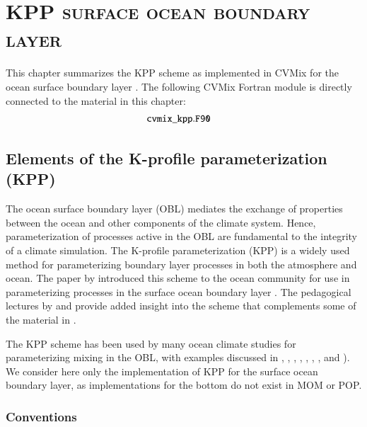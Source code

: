 \chapter{\scshape KPP surface ocean boundary layer}
\label{chapter:cvmix_kpp}

\minitoc
\vspace{.5cm}

\begin{mdframed}[backgroundcolor=lightgray!50]
  This chapter summarizes the KPP scheme as implemented in CVMix for
  the ocean surface boundary layer \citep{LargeKPP}.  The following
  CVMix Fortran module is directly connected to the material in this
  chapter:
\begin{align*} 
 & {\tt cvmix\_kpp.F90}
\end{align*}
\end{mdframed}


\section{Elements of the K-profile parameterization (KPP)}
\label{sec:implementation}

The ocean surface boundary layer (OBL) mediates the exchange of
properties between the ocean and other components of the climate
system. Hence, parameterization of processes active in the OBL are
fundamental to the integrity of a climate simulation. The K-profile
parameterization (KPP) is a widely used method for parameterizing
boundary layer processes in both the atmosphere and ocean. The paper
by \cite{LargeKPP} introduced this scheme to the ocean community for
use in parameterizing processes in the surface ocean boundary layer .
The pedagogical lectures by \cite{LargeKPP_lectures} and
\cite{Large2012} provide added insight into the scheme that
complements some of the material in \cite{LargeKPP}.

The KPP scheme has been used by many ocean climate studies for
parameterizing mixing in the OBL, with examples discussed in
\cite{Largeforcing}, \cite{HollandChowBryan1998},
\cite{Gent_etal_1998}, \cite{GOTM}, \cite{LiChowMcWilliamsFu2001},
\cite{Smyth_etal2002}, \cite{Durski_etal2004}, and
\cite{Chang_etal2005}).  We consider here only the implementation of
KPP for the surface ocean boundary layer, as implementations for the
bottom do not exist in MOM or POP.



\subsection{Conventions}

